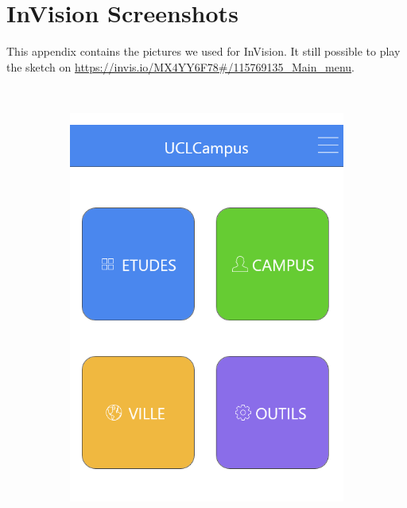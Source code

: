 \documentclass{eplmastersthesis}
\begin{document}
\chapter{InVision Screenshots}
This appendix contains the pictures we used for InVision. It still possible to play the sketch on \url{https://invis.io/MX4YY6F78#/115769135_Main_menu}.
\begin{figure}[H]
    \centering
    ~ %
    \begin{subfigure}[b]{0.3\textwidth}
        \includegraphics[width=\textwidth]{Images/InVision/home2.png}
    \end{subfigure}
    ~ %

\end{figure}
\end{document}
